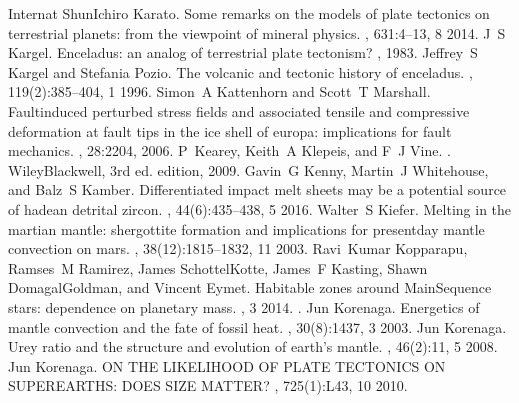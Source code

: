 \documentclass[letterpaper,10pt,english]{jupyterBook}
\begin{document}
\begin{sphinxthebibliography}{Internat}
Shun\sphinxhyphen{}Ichiro Karato. Some remarks on the models of plate tectonics on terrestrial planets: from the view\sphinxhyphen{}point of mineral physics. , 631:4–13, 8 2014.
\sphinxAtStartPar
J S Kargel. Enceladus: an analog of terrestrial plate tectonism? , 1983.
\sphinxAtStartPar
Jeffrey S Kargel and Stefania Pozio. The volcanic and tectonic history of enceladus. , 119(2):385–404, 1 1996.
\sphinxAtStartPar
Simon A Kattenhorn and Scott T Marshall. Fault\sphinxhyphen{}induced perturbed stress fields and associated tensile and compressive deformation at fault tips in the ice shell of europa: implications for fault mechanics. , 28:2204, 2006.
\sphinxAtStartPar
P Kearey, Keith A Klepeis, and F J Vine. . Wiley\sphinxhyphen{}Blackwell, 3rd ed. edition, 2009.
\sphinxAtStartPar
Gavin G Kenny, Martin J Whitehouse, and Balz S Kamber. Differentiated impact melt sheets may be a potential source of hadean detrital zircon. , 44(6):435–438, 5 2016.
\sphinxAtStartPar
Walter S Kiefer. Melting in the martian mantle: shergottite formation and implications for present\sphinxhyphen{}day mantle convection on mars. , 38(12):1815–1832, 11 2003.
\sphinxAtStartPar
Ravi Kumar Kopparapu, Ramses M Ramirez, James SchottelKotte, James F Kasting, Shawn Domagal\sphinxhyphen{}Goldman, and Vincent Eymet. Habitable zones around Main\sphinxhyphen{}Sequence stars: dependence on planetary mass. , 3 2014. .
\sphinxAtStartPar
Jun Korenaga. Energetics of mantle convection and the fate of fossil heat. , 30(8):1437, 3 2003.
\sphinxAtStartPar
Jun Korenaga. Urey ratio and the structure and evolution of earth's mantle. , 46(2):11, 5 2008.
\sphinxAtStartPar
Jun Korenaga. ON THE LIKELIHOOD OF PLATE TECTONICS ON SUPER\sphinxhyphen{}EARTHS: DOES SIZE MATTER? , 725(1):L43, 10 2010.
\sphinxAtStartPar

\end{sphinxthebibliography}
\end{document}
